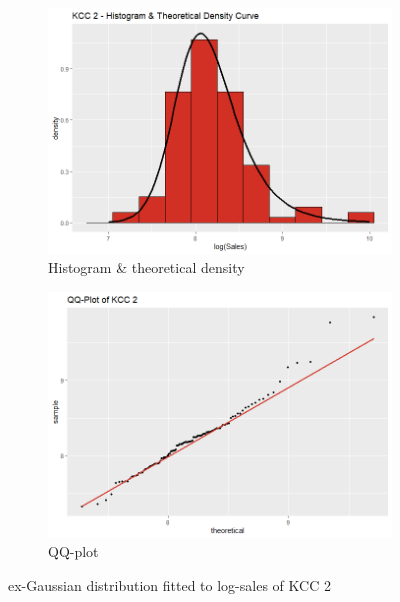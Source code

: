  \begin{figure}[H]
\centering
\begin{subfigure}{.45\textwidth}
  \centering
  \includegraphics[width=\linewidth]{figures/kcc_2_density.png}
  \caption{Histogram \& theoretical density}
  \label{fig:kcc_2_density}
\end{subfigure}
\begin{subfigure}{.45\textwidth}
  \centering
  \includegraphics[width=\linewidth]{figures/kcc_2_qqplot.png}
  \caption{QQ-plot}
  \label{fig:kcc_2_qqplot}
\end{subfigure}
\caption{ex-Gaussian distribution fitted to log-sales of \ac{KCC} 2}
\label{fig:kcc_2_margin}
\end{figure} 





